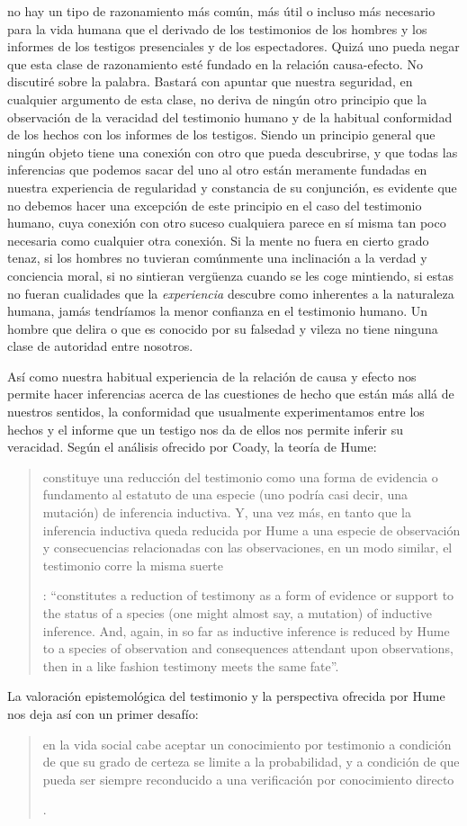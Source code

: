 {no hay un tipo de razonamiento más común, más útil o incluso más necesario para la vida humana que el derivado de los testimonios de los hombres y los informes de los testigos presenciales y de los espectadores. Quizá uno pueda negar que esta clase de razonamiento esté fundado en la relación causa-efecto. No discutiré sobre la palabra. Bastará con apuntar que nuestra seguridad, en cualquier argumento de esta clase, no deriva de ningún otro principio que la observación de la veracidad del testimonio humano y de la habitual conformidad de los hechos con los informes de los testigos. Siendo un principio general que ningún objeto tiene una conexión con otro que pueda descubrirse, y que todas las inferencias que podemos sacar del uno al otro están meramente fundadas en nuestra experiencia de regularidad y constancia de su conjunción, es evidente que no debemos hacer una excepción de este principio en el caso del testimonio humano, cuya conexión con otro suceso cualquiera parece en sí misma tan poco necesaria como cualquier otra conexión. Si la mente no fuera en cierto grado tenaz, si los hombres no tuvieran comúnmente una inclinación a la verdad y conciencia moral, si no sintieran vergüenza cuando se les coge mintiendo, si estas no fueran cualidades que la \emph{experiencia} descubre como inherentes a la naturaleza humana, jamás tendríamos la menor confianza en el testimonio humano. Un hombre que delira o que es conocido por su falsedad y vileza no tiene ninguna clase de autoridad entre nosotros}.

Así como nuestra habitual experiencia de la relación de causa y efecto nos permite hacer inferencias acerca de las cuestiones de hecho que están más allá de nuestros sentidos, la conformidad que usualmente experimentamos entre los hechos y el informe que un testigo nos da de ellos nos permite inferir su veracidad. Según el análisis ofrecido por Coady, la teoría de Hume: \blockquote[{\Cite[79]{coady1992test}}: \enquote{constitutes a reduction of testimony as a form of evidence or support to the status of a species (one might almost say, a mutation) of inductive inference. And, again, in so far as inductive inference is reduced by Hume to a species of observation and consequences attendant upon observations, then in a like fashion testimony meets the same fate}.]{constituye una reducción del testimonio como una forma de evidencia o fundamento al estatuto de una especie (uno podría casi decir, una mutación) de inferencia inductiva. Y, una vez más, en tanto que la inferencia inductiva queda reducida por Hume a una especie de observación y consecuencias relacionadas con las observaciones, en un modo similar, el testimonio corre la misma suerte} La valoración epistemológica del testimonio y la perspectiva ofrecida por Hume nos deja así con un primer desafío: \blockquote[{\Cite[294]{prades2015testimonio}}.]{en la vida social cabe aceptar un conocimiento por testimonio a condición de que su grado de certeza se limite a la probabilidad, y a condición de que pueda ser siempre reconducido a una verificación por conocimiento directo}.

